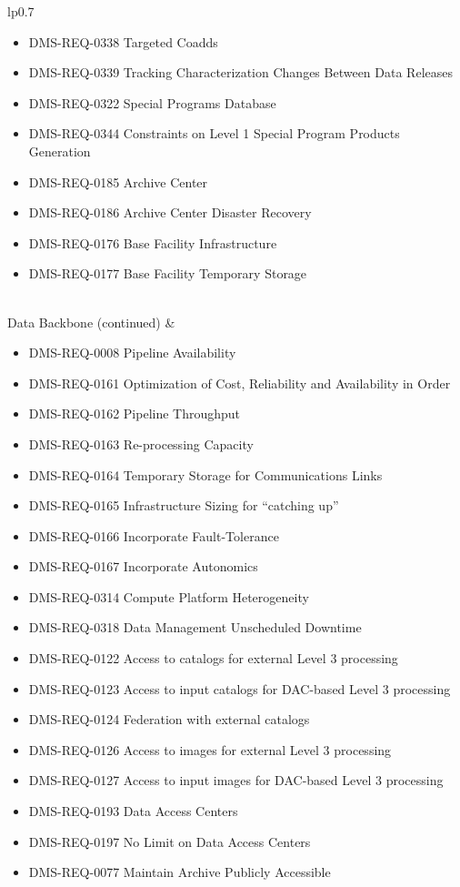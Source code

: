 \begin{xtabular}{lp{0.7\textwidth}}
\begin{itemize}
\item DMS-REQ-0338 Targeted Coadds
\item DMS-REQ-0339 Tracking Characterization Changes Between Data Releases
\item DMS-REQ-0322 Special Programs Database
\item DMS-REQ-0344 Constraints on Level 1 Special Program Products Generation
\item DMS-REQ-0185 Archive Center
\item DMS-REQ-0186 Archive Center Disaster Recovery
\item DMS-REQ-0176 Base Facility Infrastructure
\item DMS-REQ-0177 Base Facility Temporary Storage
\end{itemize} \\ \hline
Data Backbone (continued) &
\begin{itemize}
\item DMS-REQ-0008 Pipeline Availability
\item DMS-REQ-0161 Optimization of Cost, Reliability and Availability in Order
\item DMS-REQ-0162 Pipeline Throughput
\item DMS-REQ-0163 Re-processing Capacity
\item DMS-REQ-0164 Temporary Storage for Communications Links
\item DMS-REQ-0165 Infrastructure Sizing for ``catching up''
\item DMS-REQ-0166 Incorporate Fault-Tolerance
\item DMS-REQ-0167 Incorporate Autonomics
\item DMS-REQ-0314 Compute Platform Heterogeneity
\item DMS-REQ-0318 Data Management Unscheduled Downtime
\item DMS-REQ-0122 Access to catalogs for external Level 3 processing
\item DMS-REQ-0123 Access to input catalogs for DAC-based Level 3 processing
\item DMS-REQ-0124 Federation with external catalogs
\item DMS-REQ-0126 Access to images for external Level 3 processing
\item DMS-REQ-0127 Access to input images for DAC-based Level 3 processing
\item DMS-REQ-0193 Data Access Centers
\item DMS-REQ-0197 No Limit on Data Access Centers
\item DMS-REQ-0077 Maintain Archive Publicly Accessible

\end{itemize}
\end{xtabular}
